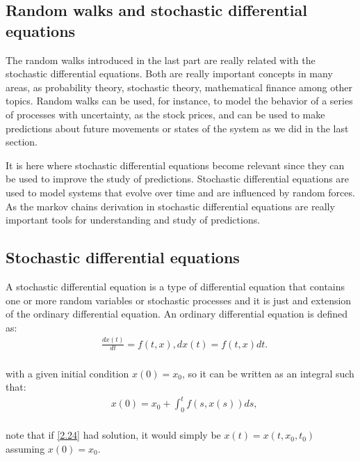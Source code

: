 \documentclass[12pt]{article}
\numberwithin{equation}{section}
\begin{document}
\subsection{Random walks and stochastic differential equations}

The random walks introduced in the last part are really related with the stochastic differential equations. Both are really important concepts in many areas, as probability theory, stochastic theory, mathematical finance among other topics. Random walks can be used, for instance, to model the behavior of a series of processes with uncertainty, as the stock prices, and can be used to make predictions about future movements or states of the system as we did in the last section. 

It is here where stochastic differential equations become relevant since they can be used to improve the study of predictions. Stochastic differential equations are used to model systems that evolve over time and are influenced by random forces. As the markov chains derivation in stochastic differential equations are really important tools for understanding and study of predictions. \cite{van1976stochastic}

\subsection{Stochastic differential equations}

A stochastic differential equation is a type of differential equation that contains one or more random variables or stochastic processes and it is just and extension of the ordinary differential equation. An ordinary differential equation is defined as: 
\begin{equation} \label{2.24}
    \begin{split}
           & \frac{dx(t)}{dt} = f(t, x), dx(t) = f(t, x)dt. \\
    \end{split}
\end{equation}

with a given initial condition $x(0) = x_0$, so it can be written as an integral such that: 
\begin{equation} \label{2.24}
    \begin{split}
           & x(0) = x_0 + \int^t_0 f(s, x(s))ds, \\
    \end{split}
\end{equation}

note that if \ref{2.24} had solution, it would simply be $x(t) = x(t, x_0, t_0)$ assuming $x(0) = x_0$.
\end{document}
